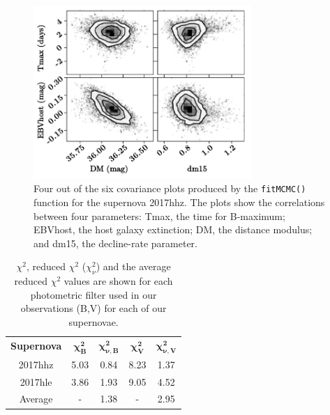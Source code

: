 \documentclass[twocolumn]{revtex4}
\begin{document}
\begin{figure}[!h]
\begin{center}
\includegraphics[width=8.25cm]{results/covariance/covariance}
\caption[]{Four out of the six covariance plots produced by the \texttt{fitMCMC()} function for the supernova 2017hhz. The plots show the correlations between four parameters: Tmax, the time for B-maximum; EBVhost, the host galaxy extinction; DM, the distance modulus; and dm15, the decline-rate parameter.}
\label{fig:covar_plots}
\vspace{-1.5em}
\end{center}
\end{figure}

\begin{table}[h!]
\centering
\begin{tabular}{c@{\hskip 20pt}c@{\hskip 20pt}c@{\hskip 20pt}c@{\hskip 20pt}c} 
 \hline
 \textbf{Supernova} & \textbf{$\boldsymbol{\chi^2_B}$} & \textbf{$\boldsymbol{\chi^2_{\nu,B}}$} & \textbf{$\boldsymbol{\chi^2_V}$} & \textbf{$\boldsymbol{\chi^2_{\nu,V}}$} \\ [0.5ex] 
 2017hhz & 5.03 & 0.84 & 8.23 & 1.37 \\
 2017hle & 3.86 & 1.93 & 9.05 & 4.52 \\
 Average & - & 1.38 & - & 2.95 \\
 \hline
\end{tabular}
\caption{$\chi^2$, reduced $\chi^2$ ($\chi^2_{\nu}$) and the average reduced $\chi^2$ values are shown for each photometric filter used in our observations (B,V) for each of our supernovae.}
\label{table:chi2}
\end{table}
\end{document}
